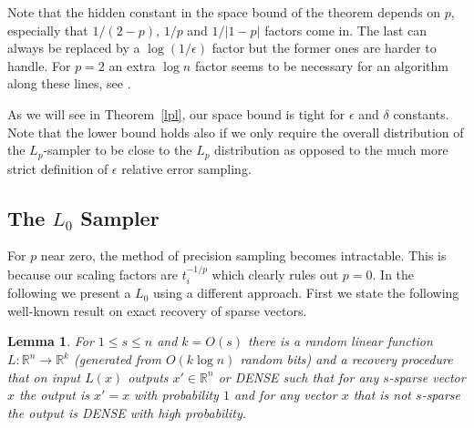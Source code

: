 \documentclass[9pt,letterpaper]{article}
\newtheorem{lemma}{Lemma}
\theoremstyle{remark}
\begin{document}
Note that the hidden constant in the space bound of the theorem depends on
$p$, especially that $1/(2-p)$, $1/p$ and $1/|1-p|$ factors come in. The last
can
always be replaced by a $\log(1/\epsilon)$ factor but the former ones are
harder to handle. For $p=2$ an extra $\log n$ factor seems to be necessary for
an algorithm along these lines, see \cite{AndoniKO10}.

As we will see in Theorem~\ref{lpl}, our space bound is tight for $\epsilon$
and $\delta$ constants. Note that the lower bound holds also if we only
require the overall distribution of the $L_p$-sampler to be close to the $L_p$
distribution as opposed to the much more strict definition of $\epsilon$
relative error sampling.

%
%
\subsection{The $L_0$ Sampler}
  For $p$ near zero, the method of precision sampling
   becomes intractable. This is because our scaling factors are
   $t_i^{-1/p}$ which clearly rules out $p=0$.
   In the following we present a $L_0$ using a different approach.
First we state the following well-known result on exact recovery of sparse vectors.
\begin{lemma}\label{lem:sparse}
For $1\le s\le n$ and $k=O(s)$ there is a random linear function
$L:\mathbb R^n\to\mathbb R^k$ (generated from $O(k\log n)$ random bits) and a
recovery procedure that on input $L(x)$ outputs $x'\in\mathbb R^n$ or DENSE
such that for any $s$-sparse vector $x$ the output is $x'=x$ with probability
$1$ and for any vector $x$ that is not $s$-sparse the output is DENSE with
high probability.%
%
\end{lemma}
\end{document}
